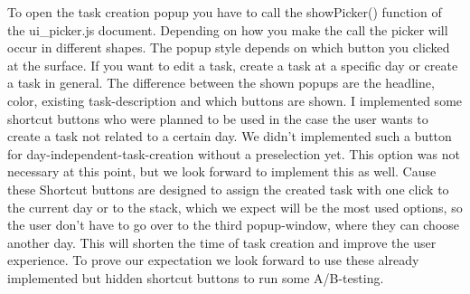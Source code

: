 To open the task creation popup you have to call the showPicker() function of the ui\_picker.js document. Depending on how you make the call the picker will occur in different shapes. The  popup style depends on which button you clicked at the surface. If you want to edit a task, create a task at a specific day or create a task in general. The difference between the shown popups are the headline, color, existing task-description and which buttons are shown. I implemented some shortcut buttons who were planned to be used in the case the user wants to create a task not related to a certain day. We didn’t implemented such a button for day-independent-task-creation without a preselection yet. This option was not necessary at this point, but we look forward to implement this as well. Cause these Shortcut buttons are designed to assign the created task with one click to the current day or to the stack, which we expect will be the most used options, so the user don’t have to go over to the third popup-window, where they can choose another day. This will shorten the time of task creation and improve the user experience. To prove our expectation we look forward to use these already implemented but hidden shortcut buttons to run some A/B-testing.





